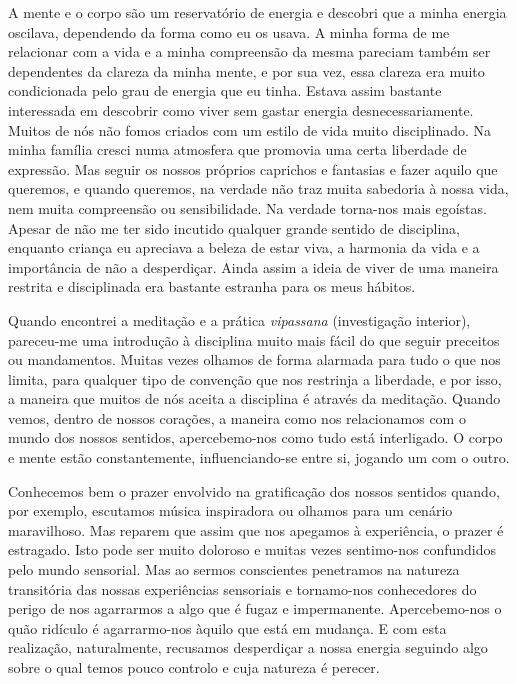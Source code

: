 A mente e o corpo são um reservatório de energia e descobri que a minha
energia oscilava, dependendo da forma como eu os usava. A minha forma de
me relacionar com a vida e a minha compreensão da mesma pareciam também
ser dependentes da clareza da minha mente, e por sua vez, essa clareza
era muito condicionada pelo grau de energia que eu tinha. Estava assim
bastante interessada em descobrir como viver sem gastar energia
desnecessariamente. Muitos de nós não fomos criados com um estilo de
vida muito disciplinado. Na minha família cresci numa atmosfera que
promovia uma certa liberdade de expressão. Mas seguir os nossos próprios
caprichos e fantasias e fazer aquilo que queremos, e quando queremos, na
verdade não traz muita sabedoria à nossa vida, nem muita compreensão ou
sensibilidade. Na verdade torna-nos mais egoístas. Apesar de não me ter
sido incutido qualquer grande sentido de disciplina, enquanto criança eu
apreciava a beleza de estar viva, a harmonia da vida e a importância de
não a desperdiçar. Ainda assim a ideia de viver de uma maneira restrita
e disciplinada era bastante estranha para os meus hábitos.

Quando encontrei a meditação e a prática \emph{vipassana} (investigação
interior), pareceu-me uma introdução à disciplina muito mais fácil do
que seguir preceitos ou mandamentos. Muitas vezes olhamos de forma
alarmada para tudo o que nos limita, para qualquer tipo de convenção que
nos restrinja a liberdade, e por isso, a maneira que muitos de nós
aceita a disciplina é através da meditação. Quando vemos, dentro de
nossos corações, a maneira como nos relacionamos com o mundo dos nossos
sentidos, apercebemo-nos como tudo está interligado. O corpo e mente
estão constantemente, influenciando-se entre si, jogando um com o outro.

Conhecemos bem o prazer envolvido na gratificação dos nossos sentidos
quando, por exemplo, escutamos música inspiradora ou olhamos para um
cenário maravilhoso. Mas reparem que assim que nos apegamos à
experiência, o prazer é estragado. Isto pode ser muito doloroso e muitas
vezes sentimo-nos confundidos pelo mundo sensorial. Mas ao sermos
conscientes penetramos na natureza transitória das nossas experiências
sensoriais e tornamo-nos conhecedores do perigo de nos agarrarmos a algo
que é fugaz e impermanente. Apercebemo-nos o quão ridículo é
agarrarmo-nos àquilo que está em mudança. E com esta realização,
naturalmente, recusamos desperdiçar a nossa energia seguindo algo sobre
o qual temos pouco controlo e cuja natureza é perecer.

